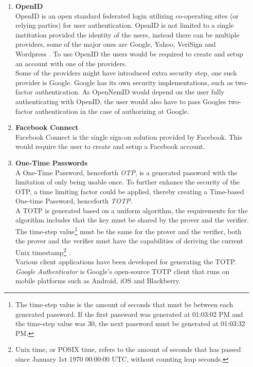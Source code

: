 \documentclass[twosided]{report}
\begin{document}
\begin{enumerate}
	\item[] \textbf{OpenID}\\
		OpenID is an open standard federated login utilizing co-operating sites (or relying parties) for user authentication. OpenID is not limited to a single institution provided the identity of the users, instead there can be multiple providers, some of the major ones are Google, Yahoo, VeriSign and Wordpress \cite{openid}. To use OpenID the users would be required to create and setup an account with one of the providers.\\
		Some of the providers might have introduced extra security step, one such provider is Google. Google has its own security implementations, such as two-factor authentication. As OpenNemID would depend on the user fully authenticating with OpenID, the user would also have to pass Googles two-factor authentication in the case of authorizing at Google.
	\item[] \textbf{Facebook Connect}\\
		Facebook Connect is the single sign-on solution provided by Facebook. This would require the user to create and setup a Facebook account. 
	\item[] \textbf{One-Time Passwords}\\
		A One-Time Password, henceforth \emph{OTP}, is a generated password with the limitation of only being usable once. To further enhance the security of the OTP, a time limiting factor could be applied, thereby creating a Time-based One-time Password, henceforth \emph{TOTP}.\\
		A TOTP is generated based on a uniform algorithm, the requirements for the algorithm includes that the key must be shared by the prover and the verifier. The time-step value\footnote{The time-step value is the amount of seconds that must be between each generated password. If the first password was generated at 01:03:02 PM and the time-step value was 30, the next password must be generated at 01:03:32 PM.} must be the same for the prover and the verifier, both the prover and the verifier must have the capabilities of deriving the current Unix timestamp\footnote{Unix time, or POSIX time, refers to the amount of seconds that has passed since January 1st 1970 00:00:00 UTC, without counting leap seconds.} \cite{rfc6238}.\\
		Various client applications have been developed for generating the TOTP. \emph{Google Authenticator} is Google's open-source TOTP client that runs on mobile platforms such as Android, iOS and Blackberry.

\end{enumerate}
\end{document}
